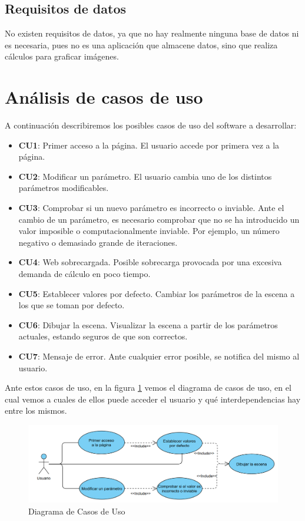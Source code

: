 \subsection{Requisitos de datos}

No existen requisitos de datos, ya que no hay realmente ninguna base de datos ni es necesaria, pues no es una aplicación que almacene datos, sino que realiza cálculos para graficar imágenes.

\section{Análisis de casos de uso}

A continuación describiremos los posibles casos de uso del software a desarrollar:
\begin{itemize}
    \item \textbf{CU1}: Primer acceso a la página. El usuario accede por primera vez a la página.
    \item \textbf{CU2}: Modificar un parámetro. El usuario cambia uno de los distintos parámetros modificables.
    \item \textbf{CU3}: Comprobar si un nuevo parámetro es incorrecto o inviable. Ante el cambio de un parámetro, es necesario comprobar que no se ha introducido un valor imposible o computacionalmente inviable. Por ejemplo, un número negativo o demasiado grande de iteraciones.
    \item \textbf{CU4}: Web sobrecargada. Posible sobrecarga provocada por una excesiva demanda de cálculo en poco tiempo.
    \item \textbf{CU5}: Establecer valores por defecto. Cambiar los parámetros de la escena a los que se toman por defecto.
    \item \textbf{CU6}: Dibujar la escena. Visualizar la escena a partir de los parámetros actuales, estando seguros de que son correctos.
    \item \textbf{CU7}: Mensaje de error. Ante cualquier error posible, se notifica del mismo al usuario.
\end{itemize}

Ante estos casos de uso, en la figura \ref{fig:casos-uso} vemos el diagrama de casos de uso, en el cual vemos a cuales de ellos puede acceder el usuario y qué interdependencias hay entre los mismos.

\begin{figure} [ht]
\centering
\includegraphics[scale = 0.6]{img/diagrama-CU.png}
\caption{Diagrama de Casos de Uso}
    \label{fig:casos-uso}
\end{figure}

